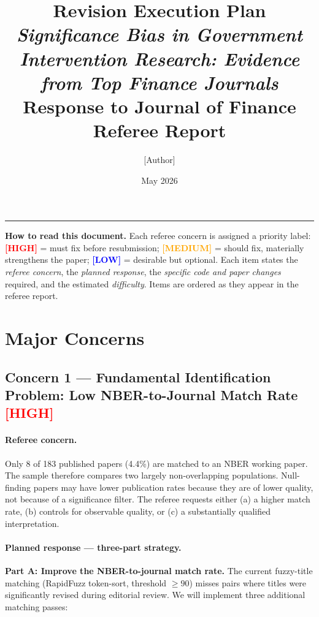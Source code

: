\documentclass[12pt]{article}
\title{\textbf{Revision Execution Plan} \\[6pt]
       \large\textit{Significance Bias in Government Intervention Research:
       Evidence from Top Finance Journals} \\[6pt]
       \normalsize Response to Journal of Finance Referee Report}
\author{[Author]}
\date{May 2026}
\newcommand{\HIGH}{\textcolor{red}{\textbf{[HIGH]}}}
\newcommand{\MED}{\textcolor{orange}{\textbf{[MEDIUM]}}}
\newcommand{\LOW}{\textcolor{blue}{\textbf{[LOW]}}}
\begin{document}
\maketitle
\thispagestyle{empty}

\noindent\rule{\linewidth}{0.4pt}

\begin{framed}
\noindent\textbf{How to read this document.}
Each referee concern is assigned a priority label:
\HIGH{} = must fix before resubmission;
\MED{} = should fix, materially strengthens the paper;
\LOW{} = desirable but optional.
Each item states the \textit{referee concern}, the \textit{planned response},
the \textit{specific code and paper changes} required, and the estimated
\textit{difficulty}.  Items are ordered as they appear in the referee report.
\end{framed}

\tableofcontents
\newpage

\section{Major Concerns}

\subsection{Concern 1 --- Fundamental Identification Problem:
            Low NBER-to-Journal Match Rate \HIGH}

\paragraph{Referee concern.}
Only 8 of 183 published papers (4.4\%) are matched to an NBER working paper.
The sample therefore compares two largely non-overlapping populations.
Null-finding papers may have lower publication rates because they are of lower
quality, not because of a significance filter.  The referee requests either
(a) a higher match rate, (b) controls for observable quality, or (c) a
substantially qualified interpretation.

\paragraph{Planned response --- three-part strategy.}

\textbf{Part A: Improve the NBER-to-journal match rate.}
The current fuzzy-title matching (RapidFuzz token-sort, threshold $\geq 90$)
misses pairs where titles were significantly revised during editorial review.
We will implement three additional matching passes:
\end{document}

